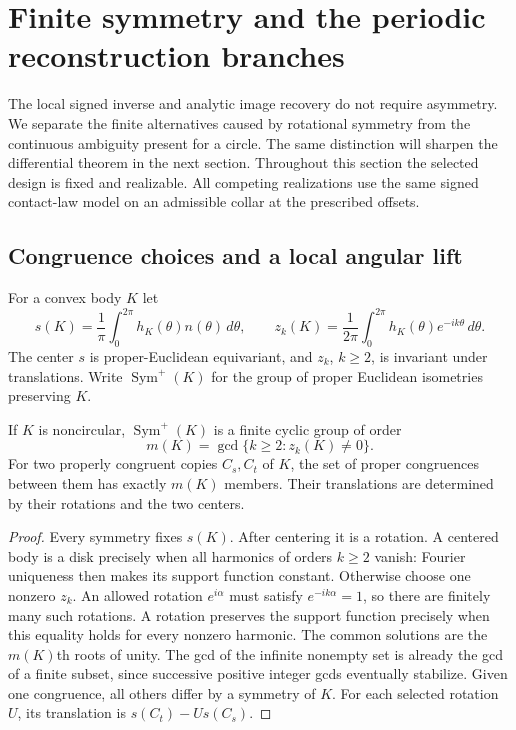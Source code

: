 \section{Finite symmetry and the periodic reconstruction branches}
\label{sec:v49-finite-symmetry}

The local signed inverse and analytic image recovery do not require
asymmetry.  We separate the finite alternatives caused by rotational
symmetry from the continuous ambiguity present for a circle.  The same
distinction will sharpen the differential theorem in the next section.
Throughout this section the selected design is fixed and realizable.
All competing realizations use the same signed contact-law model on
an admissible collar at the prescribed offsets.

\subsection{Congruence choices and a local angular lift}

For a convex body $K$ let
\[
 s(K)=\frac1\pi\int_0^{2\pi}h_K(\theta)n(\theta)\,d\theta,
 \qquad
 z_k(K)=\frac1{2\pi}\int_0^{2\pi}h_K(\theta)e^{-ik\theta}\,d\theta.
\]
The center $s$ is proper-Euclidean equivariant, and $z_k$, $k\ge2$,
is invariant under translations.  Write $\operatorname{Sym}^+(K)$
for the group of proper Euclidean isometries preserving $K$.

\begin{lemma}
\label{lem:v49-finite-congruences}
If $K$ is noncircular, $\operatorname{Sym}^+(K)$ is a finite cyclic
group of order
\[
                m(K)=\gcd\{k\ge2:z_k(K)\ne0\}.
\]
For two properly congruent copies $C_s,C_t$ of $K$, the set of proper
congruences between them has exactly $m(K)$ members.  Their translations
are determined by their rotations and the two centers.
\end{lemma}
\begin{proof}
Every symmetry fixes $s(K)$.  After centering it is a rotation.
A centered body is a disk precisely when all harmonics of orders
$k\ge2$ vanish: Fourier uniqueness then makes its support function
constant.  Otherwise choose one nonzero $z_k$.  An allowed rotation
$e^{i\alpha}$ must satisfy $e^{-ik\alpha}=1$, so there are finitely
many such rotations.  A rotation preserves the support function
precisely when this equality holds for every nonzero harmonic.
The common solutions are the $m(K)$th roots of unity.  The gcd of the
infinite nonempty set is already the gcd of a finite subset, since
successive positive integer gcds eventually stabilize.  Given one
congruence, all others differ by a symmetry of $K$.  For each selected
rotation $U$, its translation is $s(C_t)-Us(C_s)$.
\end{proof}

